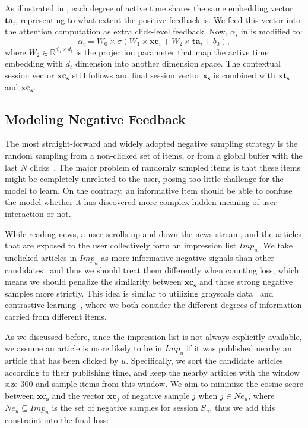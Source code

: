 As illustrated in , each degree of active time shares the same embedding vector $\mathbf{ta}_i$, representing to what extent the positive feedback is. We feed this vector into the attention computation as extra click-level 
feedback. Now, $\alpha_i$ in  is modified to:
\begin{equation}
    \alpha_i = W_0 \times \sigma (W_1 \times \mathbf{xc}_i + W_2 \times \mathbf{ta}_i + b_0),
\end{equation}
where $W_2 \in \mathbb{R}^{d_n \times d_t}$ is the projection parameter that map the active time embedding with $d_t$ dimension into another dimension space. The contextual session vector $\mathbf{xc_s}$ still follows
 and final session vector $\mathbf{x_s}$ is combined with $\mathbf{xt_s}$ and $\mathbf{xc_s}$.

\subsection{Modeling Negative Feedback}
\label{sec:negative feedback}
The most straight-forward and widely adopted negative sampling strategy is the random sampling 
from a non-clicked set of items, or from a global buffer with the last $N$ 
clicks~\cite{gabriel2019contextual}. 
The major problem of randomly sampled items is that these items might be completely unrelated to 
the user, posing too little challenge for the model to learn. On the contrary, an informative item should be able to confuse the model whether it has discovered more complex hidden meaning of user interaction or not.

While reading news, a user scrolls up and down the news stream, 
and the articles that are exposed to the user collectively 
form an impression list $Imp_u$. We take unclicked articles in $Imp_u$ as more informative negative signals than other candidates~\cite{xie2020deep} and thus 
we should treat them differently when counting loss, which means we should penalize the similarity between $\mathbf{xc_s}$ and those strong negative samples more strictly. This idea is similar to utilizing grayscale data~\cite{lin2020world} and contrastive learning~\cite{saunshi2019theoretical}, where we both consider the different degrees of information carried from different items.

As we discussed before, since the impression list is not always explicitly available, 
we assume an article is more likely to be in $Imp_u$ if it was published nearby an article that has
been clicked by $u$. Specifically, we sort the candidate articles according to their publishing time, and keep the nearby articles with the window size 300 and sample items from this window.
We aim to minimize the cosine score between $\mathbf{xc_s}$ and the vector $\mathbf{xc}_j$ of negative sample $j$ when 
$j\in Ne_u$, where $Ne_u\subseteq Imp_u$ is the set of negative samples for session $S_u$, thus we add this constraint into the final loss: 

